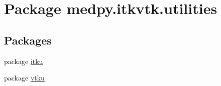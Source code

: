 \hypertarget{namespacemedpy_1_1itkvtk_1_1utilities}{
\section{Package medpy.itkvtk.utilities}
\label{namespacemedpy_1_1itkvtk_1_1utilities}
}
\subsection*{Packages}
\begin{DoxyCompactItemize}
\item 
package \hyperlink{namespacemedpy_1_1itkvtk_1_1utilities_1_1itku}{itku}
\item 
package \hyperlink{namespacemedpy_1_1itkvtk_1_1utilities_1_1vtku}{vtku}
\end{DoxyCompactItemize}
